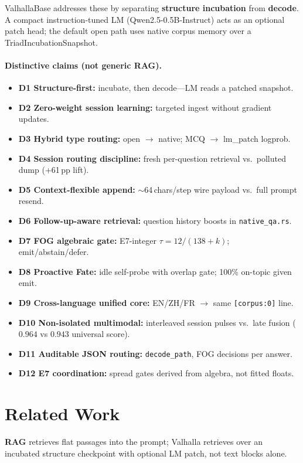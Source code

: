 \documentclass[11pt,a4paper]{article}
\begin{document}
ValhallaBase addresses these by separating \textbf{structure incubation} from \textbf{decode}. A compact instruction-tuned LM (Qwen2.5-0.5B-Instruct) acts as an optional patch head; the default open path uses native corpus memory over a TriadIncubationSnapshot.

\paragraph{Distinctive claims (not generic RAG).}
\begin{itemize}
  \item \textbf{D1 Structure-first:} incubate, then decode---LM reads a patched snapshot.
  \item \textbf{D2 Zero-weight session learning:} targeted ingest without gradient updates.
  \item \textbf{D3 Hybrid type routing:} open $\to$ native; MCQ $\to$ lm\_patch logprob.
  \item \textbf{D4 Session routing discipline:} fresh per-question retrieval vs.\ polluted dump (+61\,pp lift).
  \item \textbf{D5 Context-flexible append:} $\sim$64\,chars/step wire payload vs.\ full prompt resend.
  \item \textbf{D6 Follow-up-aware retrieval:} question history boosts in \texttt{native\_qa.rs}.
  \item \textbf{D7 FOG algebraic gate:} E7-integer $\tau=12/(138+k)$; emit/abstain/defer.
  \item \textbf{D8 Proactive Fate:} idle self-probe with overlap gate; 100\% on-topic given emit.
  \item \textbf{D9 Cross-language unified core:} EN/ZH/FR $\to$ same \texttt{[corpus:0]} line.
  \item \textbf{D10 Non-isolated multimodal:} interleaved session pulses vs.\ late fusion ($0.964$ vs $0.943$ universal score).
  \item \textbf{D11 Auditable JSON routing:} \texttt{decode\_path}, FOG decisions per answer.
  \item \textbf{D12 E7 coordination:} spread gates derived from algebra, not fitted floats.
\end{itemize}

\section{Related Work}

\textbf{RAG} retrieves flat passages into the prompt; Valhalla retrieves over an incubated structure checkpoint with optional LM patch, not text blocks alone.
\end{document}

